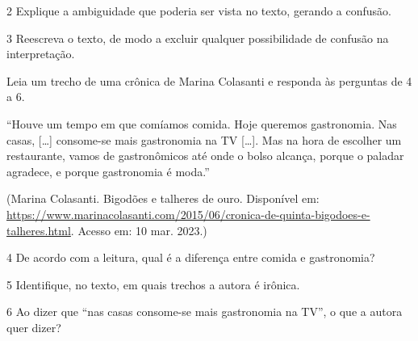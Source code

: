 \num{2} Explique a ambiguidade que poderia ser vista no texto, gerando a
confusão.



\num{3} Reescreva o texto, de modo a excluir qualquer possibilidade de
confusão na interpretação.



Leia um trecho de uma crônica de Marina Colasanti e responda às
perguntas de 4 a 6.

``Houve um tempo em que comíamos comida. Hoje queremos gastronomia. Nas
casas, {[}\ldots{]} consome-se mais gastronomia na TV {[}\ldots{]}. Mas
na hora de escolher um restaurante, vamos de gastronômicos até onde o
bolso alcança, porque o paladar agradece, e porque gastronomia é moda.''

(Marina Colasanti. Bigodões e talheres de ouro. Disponível em:
\url{https://www.marinacolasanti.com/2015/06/cronica-de-quinta-bigodoes-e-talheres.html}.
Acesso em: 10 mar. 2023.)

\num{4} De acordo com a leitura, qual é a diferença entre comida e
gastronomia?



\num{5} Identifique, no texto, em quais trechos a autora é irônica.



\num{6} Ao dizer que ``nas casas consome-se mais gastronomia na TV'', o
que a autora quer dizer?



